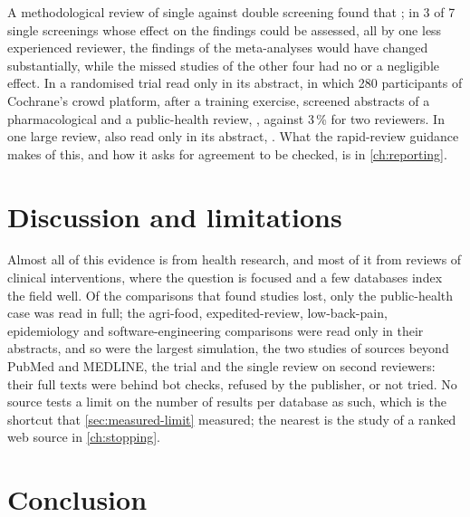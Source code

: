A methodological review of single against double screening found that
; in 3 of 7 single
screenings whose effect on the findings could be assessed, all by one
less experienced reviewer, the findings of the meta-analyses would have
changed substantially, while the missed studies of the other four had no
or a negligible effect.
In a randomised trial read only in its abstract, in which 280
participants of Cochrane's crowd platform, after a training exercise,
screened abstracts of a pharmacological and a public-health review,
, against 3\,\% for two
reviewers.
In one large review, also read only in its abstract,
.
What the rapid-review guidance makes of this, and how it asks for
agreement to be checked, is in \cref{ch:reporting}.

\section{Discussion and limitations}
\label{sec:abbreviated-discussion}

Almost all of this evidence is from health research, and most of it from
reviews of clinical interventions, where the question is focused and a
few databases index the field well.
Of the comparisons that found studies lost, only the public-health case
was read in full; the agri-food, expedited-review, low-back-pain,
epidemiology and software-engineering comparisons were read only in their
abstracts, and so were the largest simulation, the
two studies of sources beyond PubMed and MEDLINE, the trial and the
single review on second reviewers: their full texts were behind bot
checks, refused by the publisher, or not tried.
No source tests a limit on the number of results per database as such,
which is the shortcut that \cref{sec:measured-limit} measured; the
nearest is the study of a ranked web source in \cref{ch:stopping}.

\section{Conclusion}
\label{sec:abbreviated-conclusion}

